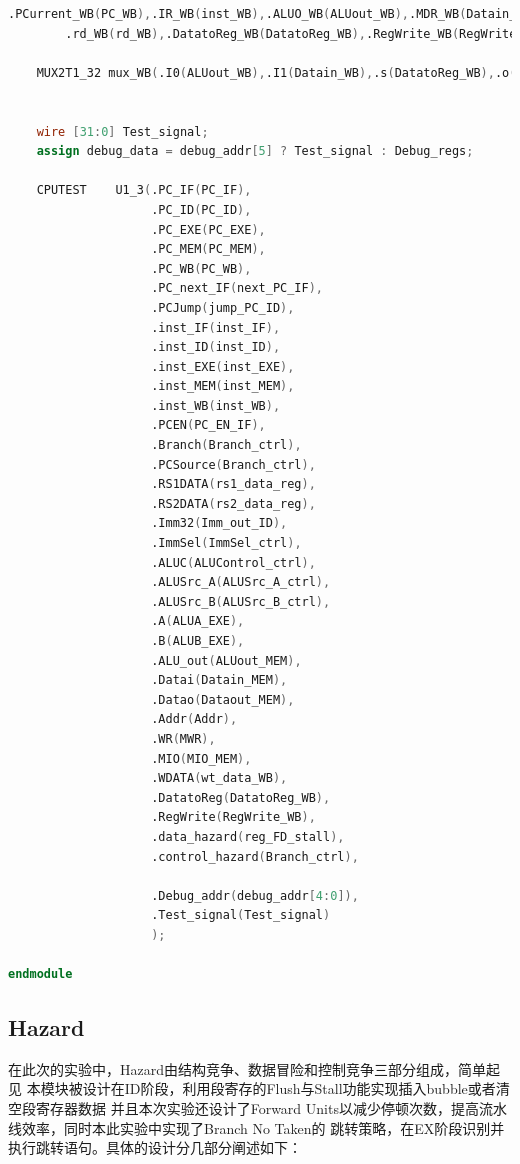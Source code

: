 \begin{lstlisting}[language = {verilog}]
        .PCurrent_WB(PC_WB),.IR_WB(inst_WB),.ALUO_WB(ALUout_WB),.MDR_WB(Datain_WB),
        .rd_WB(rd_WB),.DatatoReg_WB(DatatoReg_WB),.RegWrite_WB(RegWrite_WB));
    
    MUX2T1_32 mux_WB(.I0(ALUout_WB),.I1(Datain_WB),.s(DatatoReg_WB),.o(wt_data_WB));


    wire [31:0] Test_signal;
    assign debug_data = debug_addr[5] ? Test_signal : Debug_regs;
    
    CPUTEST    U1_3(.PC_IF(PC_IF),
                    .PC_ID(PC_ID),
                    .PC_EXE(PC_EXE),
                    .PC_MEM(PC_MEM),
                    .PC_WB(PC_WB),
                    .PC_next_IF(next_PC_IF),
                    .PCJump(jump_PC_ID),
                    .inst_IF(inst_IF),
                    .inst_ID(inst_ID),
                    .inst_EXE(inst_EXE),
                    .inst_MEM(inst_MEM),
                    .inst_WB(inst_WB),
                    .PCEN(PC_EN_IF),
                    .Branch(Branch_ctrl),
                    .PCSource(Branch_ctrl),
                    .RS1DATA(rs1_data_reg),
                    .RS2DATA(rs2_data_reg),
                    .Imm32(Imm_out_ID),
                    .ImmSel(ImmSel_ctrl),
                    .ALUC(ALUControl_ctrl),
                    .ALUSrc_A(ALUSrc_A_ctrl),
                    .ALUSrc_B(ALUSrc_B_ctrl),
                    .A(ALUA_EXE),
                    .B(ALUB_EXE),
                    .ALU_out(ALUout_MEM),
                    .Datai(Datain_MEM),
                    .Datao(Dataout_MEM),
                    .Addr(Addr),
                    .WR(MWR),
                    .MIO(MIO_MEM),
                    .WDATA(wt_data_WB),
                    .DatatoReg(DatatoReg_WB),
                    .RegWrite(RegWrite_WB),
                    .data_hazard(reg_FD_stall),
                    .control_hazard(Branch_ctrl),

                    .Debug_addr(debug_addr[4:0]),
                    .Test_signal(Test_signal)    
                    );

endmodule
\end{lstlisting}

\subsection{Hazard}
在此次的实验中，Hazard由结构竞争、数据冒险和控制竞争三部分组成，简单起见
本模块被设计在ID阶段，利用段寄存的Flush与Stall功能实现插入bubble或者清空段寄存器数据
并且本次实验还设计了Forward Units以减少停顿次数，提高流水线效率，同时本此实验中实现了Branch No Taken的
跳转策略，在EX阶段识别并执行跳转语句。具体的设计分几部分阐述如下：

